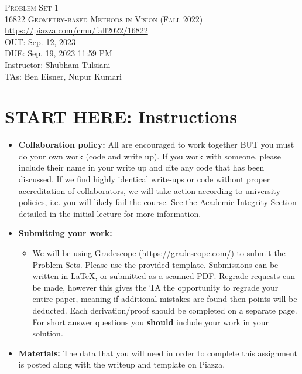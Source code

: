 \documentclass[11pt,addpoints,answers]{exam}
\title{\textsc{\hwName}} %
\author{}
\date{}
\date{}
\numberwithin{equation}{section} %
\numberwithin{figure}{section} %
\numberwithin{table}{section} %
\newcommand{\courseNum}{\href{https://geometric3d.github.io}{16822}}
\newcommand{\courseName}{\href{https://geometric3d.github.io}{Geometry-based Methods in Vision}}
\newcommand{\courseSem}{\href{https://geometric3d.github.io}{Fall 2022}}
\newcommand{\courseUrl}{\url{https://piazza.com/cmu/fall2022/16822}}
\newcommand{\hwNum}{Problem Set 1}
\newcommand{\hwTopic}{Projective Geometry and Homography }
\newcommand{\outDate}{Sep. 12, 2023}
\newcommand{\dueDate}{Sep. 19, 2023 11:59 PM}
\newcommand{\instructorName}{Shubham Tulsiani}
\newcommand{\taNames}{Ben Eisner, Nupur Kumari}
\begin{document}
\section*{}
\begin{center}
  \textsc{\LARGE \hwNum} \\
  \vspace{1em}
  \textsc{\large \courseNum{} \courseName{} (\courseSem)} \\
  \courseUrl\\
  \vspace{1em}
  OUT: \outDate \\
  DUE: \dueDate \\
  Instructor: \instructorName \\
  TAs: \taNames
\end{center}

\section*{START HERE: Instructions}
\begin{itemize}
\item \textbf{Collaboration policy:} All are encouraged to work together BUT you must do your own work (code and write up). If you work with someone, please include their name in your write up and cite any code that has been discussed. If we find highly identical write-ups or code without proper accreditation of collaborators, we will take action according to university policies, i.e. you will likely fail the course. See the \href{https://www.dropbox.com/s/z6o0tinc9eaez46/L01_Overview.pdf?dl=0}{Academic Integrity Section} detailed in the initial lecture for more information.


\item\textbf{Submitting your work:}

\begin{itemize}

\item We will be using Gradescope (\url{https://gradescope.com/}) to submit the Problem Sets. Please use the provided template. Submissions can be written in LaTeX, or submitted as a scanned PDF. Regrade requests can be made, however this gives the TA the opportunity to regrade your entire paper, meaning if additional mistakes are found then points will be deducted.
Each derivation/proof should be  completed on a separate page. For short answer questions you \textbf{should} include your work in your solution.  
\end{itemize}

\item \textbf{Materials:} The data that you will need in order to complete this assignment is posted along with the writeup and template on Piazza.

\end{itemize}
\end{document}
